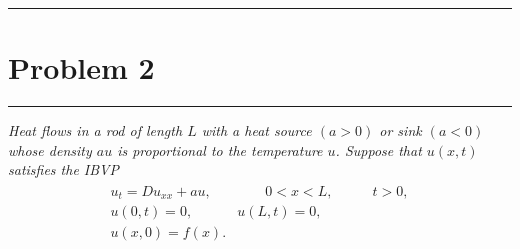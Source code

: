\documentclass[fontsize=11pt]{article} %
\theoremstyle{plain}
\numberwithin{equation}{section} %
\numberwithin{figure}{section} %
\numberwithin{table}{section} %
\begin{document}
\begin{center}
    \noindent\rule{5cm}{1pt}
\end{center}
\section{\bf Problem 2}
\begin{center}
    \noindent\rule{5cm}{1pt}
\end{center}

\emph{Heat flows in a rod of length $L$ with a heat source $(a > 0)$ or sink $(a < 0)$ whose density $au$ is proportional to the temperature $u$.  Suppose that $u(x,t)$ satisfies the IBVP}
\begin{align*}
    \begin{array}{rrr}
        u_t = Du_{xx} + au, & \qquad 0 < x < L, & \qquad t > 0, \\
        u(0, t) = 0, & u(L, t) = 0, & \\
        u(x, 0) = f(x). & &
    \end{array}
\end{align*}
\end{document}
